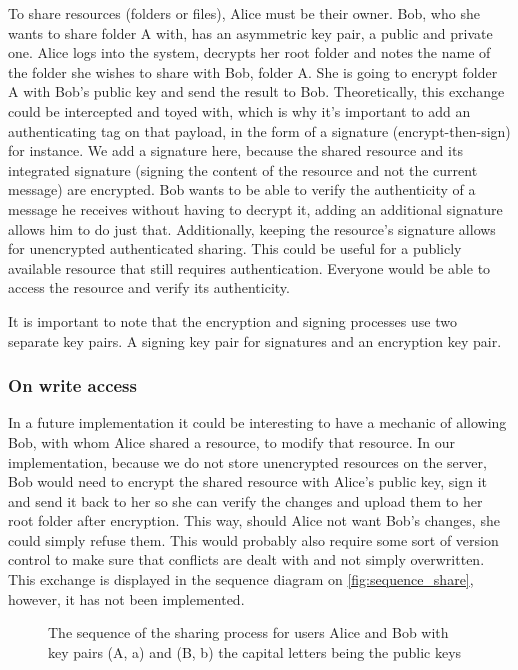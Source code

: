 To share resources (folders or files), Alice must be their owner. Bob, who she wants to share folder A with, has an asymmetric key pair, a public and private one. Alice logs into the system, decrypts her root folder and notes the name of the folder she wishes to share with Bob, folder A. She is going to encrypt folder A with Bob's public key and send the result to Bob. Theoretically, this exchange could be intercepted and toyed with, which is why it's important to add an authenticating tag on that payload, in the form of a signature (encrypt-then-sign) for instance. We add a signature here, because the shared resource and its integrated signature (signing the content of the resource and not the current message) are encrypted. Bob wants to be able to verify the authenticity of a message he receives without having to decrypt it, adding an additional signature allows him to do just that. Additionally, keeping the resource's signature allows for unencrypted authenticated sharing. This could be useful for a publicly available resource that still requires authentication. Everyone would be able to access the resource and verify its authenticity.

It is important to note that the encryption and signing processes use two separate key pairs. A signing key pair for signatures and an encryption key pair. 

\subsubsection{On write access}
In a future implementation it could be interesting to have a mechanic of allowing Bob, with whom Alice shared a resource, to modify that resource. In our implementation, because we do not store unencrypted resources on the server, Bob would need to encrypt the shared resource with Alice's public key, sign it and send it back to her so she can verify the changes and upload them to her root folder after encryption. This way, should Alice not want Bob's changes, she could simply refuse them. This would probably also require some sort of version control to make sure that conflicts are dealt with and not simply overwritten. This exchange is displayed in the sequence diagram on \autoref{fig:sequence_share}, however, it has not been implemented.

\begin{minipage}{1\textwidth}
    \begin{figure}[H]
        \centering
        
        \caption{\label{fig:sequence_share} The sequence of the sharing process for users Alice and Bob with key pairs (A, a) and (B, b) the capital letters being the public keys }
    \end{figure}
\end{minipage}


